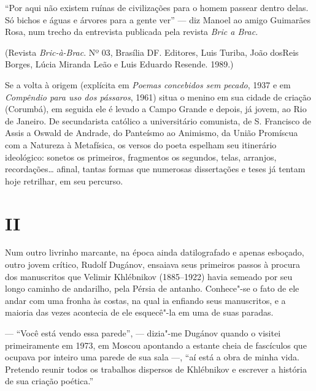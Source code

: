 ``Por aqui não existem ruínas de civilizações para o homem passear
dentro delas. Só bichos e águas e árvores para a gente ver'' --- diz
Manoel ao amigo Guimarães Rosa, num trecho da entrevista publicada pela
revista \emph{Bric a Brac.}


(Revista \emph{Bric-à-Brac}. Nº 03, Brasília DF. Editores,
Luis Turiba, João dosReis Borges, Lúcia Miranda Leão e Luis Eduardo
Resende. 1989.)

Se a volta à origem (explícita em \emph{Poemas concebidos sem pecado}, 1937 e em \emph{Compêndio para uso dos pássaros}, 1961) situa o menino
em sua cidade de criação (Corumbá), em seguida ele é levado a Campo
Grande e depois, já jovem, ao Rio de Janeiro. De secundarista católico a
universitário comunista, de S. Francisco de Assis a Oswald de Andrade,
do Panteísmo ao Animismo, da União Promíscua com a Natureza à
Metafísica, os versos do poeta espelham seu itinerário ideológico:
sonetos os primeiros, fragmentos os segundos, telas, arranjos,
recordações\ldots{} afinal, tantas formas que numerosas dissertações e teses
já tentam hoje retrilhar, em seu percurso.

\section{II}

Num outro livrinho marcante, na época ainda datilografado e apenas
esboçado, outro jovem crítico, Rudolf Dugánov, ensaiava seus primeiros
passos à procura dos manuscritos que Velimir Khlébnikov (1885--1922)
havia semeado por seu longo caminho de andarilho, pela Pérsia de
antanho. Conhece"-se o fato de ele andar com uma fronha às costas, na
qual ia enfiando seus manuscritos, e a maioria das vezes acontecia de
ele esquecê"-la em uma de suas paradas.

--- ``Você está vendo essa parede'', --- dizia"-me Dugánov quando o visitei
primeiramente em 1973, em Moscou apontando a estante cheia de fascículos que
ocupava por inteiro uma parede de sua sala ---, ``aí está a obra
de minha vida. Pretendo reunir todos os trabalhos dispersos de Khlébnikov
e escrever a história de sua criação poética.''

